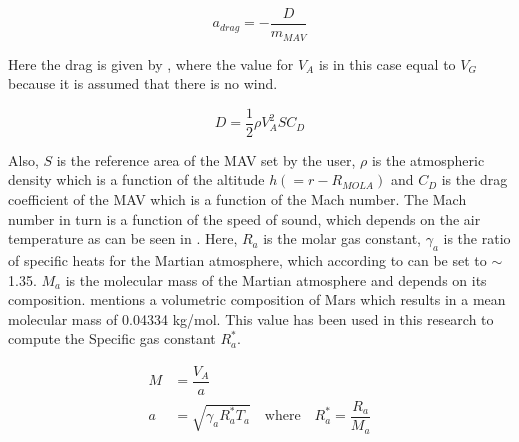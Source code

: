 \begin{equation} \label{eq:dragModel}
a_{drag}=-\dfrac{D}{m_{MAV}}
\end{equation}


\noindent
Here the drag is given by , where the value for $V_{A}$ is in this case equal to $V_{G}$ because it is assumed that there is no wind.

\begin{equation} \label{eq:dragDragModel}
D=\dfrac{1}{2}\rho V_{A}^{2}SC_{D}
\end{equation}


\noindent
Also, $S$ is the reference area of the \ac{MAV} set by the user, $\rho$ is the atmospheric density which is a function of the altitude $h\left(=r-R_{MOLA}\right)$ and $C_{D}$ is the drag coefficient of the \ac{MAV} which is a function of the Mach number. The Mach number in turn is a function of the speed of sound, which depends on the air temperature as can be seen in . Here, $R_{a}$ is the molar gas constant, $\gamma_{a}$ is the ratio of specific heats for the Martian atmosphere, which according to \cite{ho2002radio} can be set to $\sim$1.35. $M_{a}$ is the molecular mass of the Martian atmosphere and depends on its composition. \cite{williams2015} mentions a volumetric composition of Mars which results in a mean molecular mass of 0.04334 kg/mol. This value has been used in this research to compute the Specific gas constant $R_{a}^{*}$.





 \begin{equation} \label{eq:machAndSpeedOfSound}
\begin{split}
M &= \dfrac{V_{A}}{a} \\
a &= \sqrt{\gamma_{a}R_{a}^{*}T_{a}} \quad \text{where} \quad R_{a}^{*}=\dfrac{R_{a}}{M_{a}} \\
\end{split}
\end{equation}

